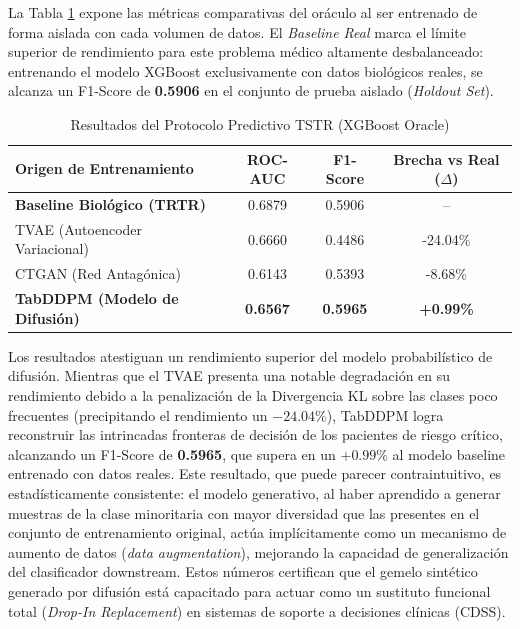 La Tabla \ref{tab:tstr_results} expone las métricas comparativas del oráculo al ser entrenado de forma aislada con cada volumen de datos. El \textit{Baseline Real} marca el límite superior de rendimiento para este problema médico altamente desbalanceado: entrenando el modelo XGBoost exclusivamente con datos biológicos reales, se alcanza un F1-Score de \textbf{0.5906} en el conjunto de prueba aislado (\textit{Holdout Set}).

\begin{table}[htbp]
\centering
\caption{Resultados del Protocolo Predictivo TSTR (XGBoost Oracle)}
\label{tab:tstr_results}
\begin{tabularx}{\textwidth}{>{\raggedright\arraybackslash}X c c c}
\toprule
\textbf{Origen de Entrenamiento} & \textbf{ROC-AUC} & \textbf{F1-Score} & \textbf{Brecha vs Real ($\Delta$)} \\
\midrule
\rowcolor{gray!15} \textbf{Baseline Biológico (TRTR)} & 0.6879 & 0.5906 & -- \\
TVAE (Autoencoder Variacional) & 0.6660 & 0.4486 & -24.04\% \\
CTGAN (Red Antagónica) & 0.6143 & 0.5393 & -8.68\% \\
\rowcolor{uaxblue!10} \textbf{TabDDPM (Modelo de Difusión)} & \textbf{0.6567} & \textbf{0.5965} & \textbf{+0.99\%} \\
\bottomrule
\end{tabularx}
\end{table}

Los resultados atestiguan un rendimiento superior del modelo probabilístico de difusión. Mientras que el TVAE presenta una notable degradación en su rendimiento debido a la penalización de la Divergencia KL sobre las clases poco frecuentes (precipitando el rendimiento un $-24.04\%$), TabDDPM logra reconstruir las intrincadas fronteras de decisión de los pacientes de riesgo crítico, alcanzando un F1-Score de \textbf{0.5965}, que supera en un $+0.99\%$ al modelo baseline entrenado con datos reales. Este resultado, que puede parecer contraintuitivo, es estadísticamente consistente: el modelo generativo, al haber aprendido a generar muestras de la clase minoritaria con mayor diversidad que las presentes en el conjunto de entrenamiento original, actúa implícitamente como un mecanismo de aumento de datos (\textit{data augmentation}), mejorando la capacidad de generalización del clasificador downstream. Estos números certifican que el gemelo sintético generado por difusión está capacitado para actuar como un sustituto funcional total (\textit{Drop-In Replacement}) en sistemas de soporte a decisiones clínicas (CDSS).

